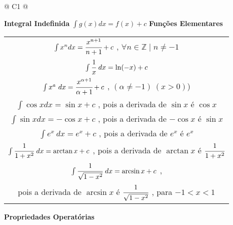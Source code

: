 		\begin{longtable}{
		@{}
		C{1\textwidth} 
		@{}}

			\toprule
			\textbf{Integral Indefinida}
			\tabularnewline
			\midrule
			{\large $\int g(x) dx = f(x) + c$}
			\tabularnewline
			\midrule
			\textbf{Funções Elementares}
			\tabularnewline
			\midrule
			{\large \begin{tabular}[c]{@{}c@{}}
			
    			$\int x^{n} dx = \cfrac {x^{n + 1}}{n+1} + c$ , $\forall n \in \mathbb{Z} \mid n \neq -1$ \\
    			
    			$\int \cfrac{1}{x} \ dx = \ln (-x) + c$ \\
    			
    			$\int x^{a} \ dx = \cfrac{x^{\alpha + 1}}{\alpha + 1} + c$ , $(\alpha \neq -1) \ (x > 0)$) \\
    			
    			$\int \cos xdx = \sin x + c$ , pois a derivada de $\sin x$ é $\cos x$ \\
    			
    			$\int \sin xdx = - \cos x + c$ , pois a derivada de $- \cos x$ é $\sin x$ \\
    			
    			$\int e^{x} \ dx = e^{x} + c$ , pois a derivada de $e^{x} $ é $e^{x}$ \\
    			
    			$\int \cfrac{1}{1 + x^{2}} \ dx = \arctan x + c$ , pois a derivada de $\arctan x$ é $\cfrac{1}{1+x^{2}}$ \\
    			
    			$\int \cfrac{1}{\sqrt{1 - x^{2}}} \ dx = \arcsin x + c$ , \\
    			
    			pois a derivada de $\arcsin x$ é $\cfrac{1}{\sqrt{1 - x^{2}}}$ , para $-1 < x < 1$
			
			\end{tabular}}
			\tabularnewline
			\midrule
			\textbf{Propriedades Operatórias}
			\tabularnewline
			\midrule
			{\large \begin{tabular}[c]{@{}c@{}}
			

\end{tabular}}
\end{longtable}
